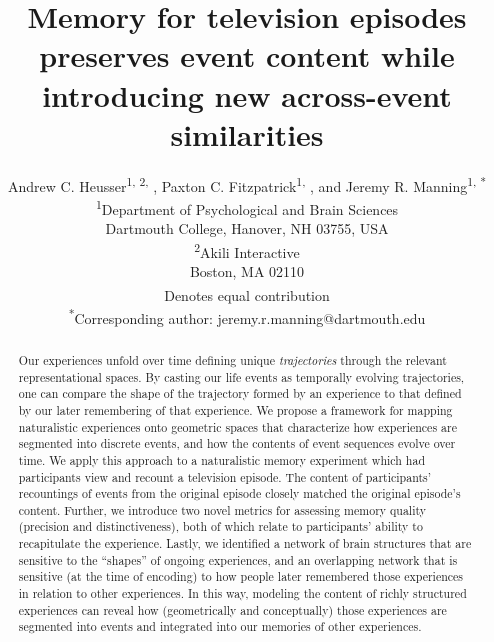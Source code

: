 \documentclass{article}
\title{Memory for television episodes preserves event content while introducing new across-event similarities}
\author{Andrew C. Heusser\textsuperscript{1, 2, \textdagger}, Paxton C. Fitzpatrick\textsuperscript{1, \textdagger}, and Jeremy R. Manning\textsuperscript{1, *}\\\textsuperscript{1}Department of Psychological and Brain Sciences\\Dartmouth College, Hanover, NH 03755, USA\\\textsuperscript{2}Akili Interactive\\Boston, MA 02110\\\textsuperscript{\textdagger}Denotes equal contribution\\\textsuperscript{*}Corresponding author: jeremy.r.manning@dartmouth.edu}
\begin{document}
\maketitle

\begin{abstract}
Our experiences unfold over time defining unique \textit{trajectories} through the relevant representational spaces.  By casting our life events as temporally evolving trajectories, one can compare the shape of the trajectory formed by an experience to that defined by our later remembering of that experience.  We propose a framework for mapping naturalistic experiences onto geometric spaces that characterize how experiences are segmented into discrete events, and how the contents of event sequences evolve over time.  We apply this approach to a naturalistic memory experiment which had participants view and recount a television episode.  The content of participants' recountings of events from the original episode closely matched the original episode's content. Further, we introduce two novel metrics for assessing memory quality (precision and distinctiveness), both of which relate to participants' ability to recapitulate the experience.  Lastly, we identified a network of brain structures that are sensitive to the ``shapes'' of ongoing experiences, and an overlapping network that is sensitive (at the time of encoding) to how people later remembered those experiences in relation to other experiences.  In this way, modeling the content of richly structured experiences can reveal how (geometrically and conceptually) those experiences are segmented into events and integrated into our memories of other experiences.
\end{abstract}
\end{document}
